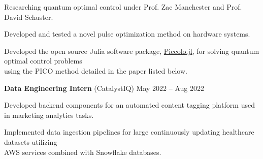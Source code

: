\documentclass[9pt]{extarticle}
\begin{document}
\begin{compactitem}
\item Researching quantum optimal control under Prof. Zac Manchester and Prof. David Schuster.  
\item Developed and tested a novel pulse optimization method on hardware systems. 
\item Developed the open source Julia software package, \href{https://github.com/aarontrowbridge/Piccolo.jl}{Piccolo.jl}, for solving quantum optimal control problems \\ 
using the PICO method detailed in the paper listed below. 
\normalsize
\end{compactitem}





\vspace{7pt}
\large\textbf{Data Engineering Intern} \normalsize (CatalystIQ) \hfill \small May 2022 -- Aug 2022 

\begin{compactitem}
  \normalsize
\item Developed backend components for an automated content tagging platform used in marketing analytics tasks.
\item Implemented data ingestion pipelines for large continuously updating healthcare datasets utilizing \\ AWS services combined with Snowflake databases. 
\end{compactitem}
\end{document}
